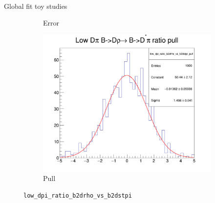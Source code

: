 \documentclass{beamer}
\begin{document}
\begin{frame}{Global fit toy studies}
\begin{figure}
\begin{subfigure}{0.33\textwidth}
      \caption{Error}
    \end{subfigure}%
    \begin{subfigure}{0.33\textwidth}
      \includegraphics[width = 1.0\textwidth]{Plots/low_dpi_ratio_b2drho_vs_b2dstpi_pull.png}
      \caption{Pull}
    \end{subfigure}
    \caption{\texttt{low\_dpi\_ratio\_b2drho\_vs\_b2dstpi}}
  \end{figure}
\end{frame}
\end{document}
